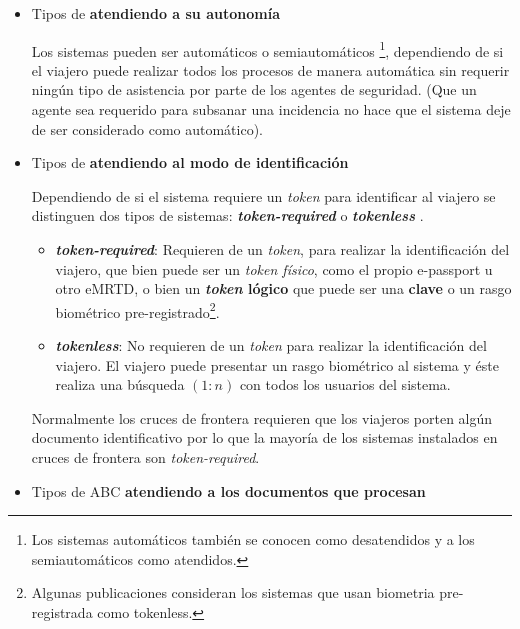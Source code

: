 \begin{itemize}
\item
Tipos de  \textbf{atendiendo a su autonomía}

Los sistemas  pueden ser automáticos o semiautomáticos \footnote{Los sistemas automáticos también se conocen como desatendidos y a los semiautomáticos como atendidos.}, dependiendo de si el viajero puede realizar todos los procesos de manera automática sin requerir ningún tipo de asistencia por parte de los agentes de seguridad. (Que un agente sea requerido para subsanar una incidencia no hace que el sistema deje de ser considerado como automático).

\item
Tipos de  \textbf{atendiendo al modo de identificación}

Dependiendo de si el sistema requiere un \textit{\gls{token}} para identificar al viajero se distinguen dos tipos de sistemas: \textbf{\textit{\gls{token-required}}} o \textbf{\textit{\gls{tokenless}}} \cite{ISO/Biometric}.

\begin{itemize}
    \item
    \textit{\textbf{\gls{token-required}}}:
    Requieren de un \textit{\gls{token}}, para realizar la identificación del viajero, que bien puede ser un \textit{\gls{token} físico}, como el propio \gls{e-passport} u otro \gls{eMRTD}, o bien un \textbf{\textit{\gls{token}} lógico} que puede ser una \textbf{clave} o un rasgo biométrico pre-registrado\footnote{Algunas publicaciones consideran los sistemas que usan \gls{biometria} pre-registrada como \gls{tokenless}.}.
    \item
    \textit{\textbf{\gls{tokenless}}}:
    No requieren de un \textit{\gls{token}} para realizar la identificación del viajero. El viajero puede presentar un rasgo biométrico al sistema y éste realiza una búsqueda \textbf{$(1:n)$} con todos los usuarios del sistema.
\end{itemize}

Normalmente los cruces de frontera requieren que los viajeros porten algún documento identificativo por lo que la mayoría de los sistemas  instalados en cruces de frontera son  \textit{\gls{token-required}}.

\item
Tipos de ABC \textbf{atendiendo a los documentos que procesan}


\end{itemize}
